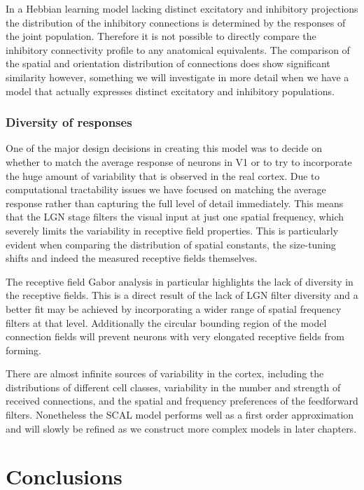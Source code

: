 In a Hebbian learning model lacking distinct excitatory and inhibitory
projections the distribution of the inhibitory connections is
determined by the responses of the joint population. Therefore it is
not possible to directly compare the inhibitory connectivity profile
to any anatomical equivalents. The comparison of the spatial and
orientation distribution of connections does show significant
similarity however, something we will investigate in more detail when
we have a model that actually expresses distinct excitatory and
inhibitory populations.

\subsubsection{Diversity of responses}

One of the major design decisions in creating this model was to decide
on whether to match the average response of neurons in V1 or to try to
incorporate the huge amount of variability that is observed in the
real cortex. Due to computational tractability issues we have focused
on matching the average response rather than capturing the full level
of detail immediately. This means that the LGN stage filters the
visual input at just one spatial frequency, which severely limits the
variability in receptive field properties. This is particularly
evident when comparing the distribution of spatial constants, the 
size-tuning shifts and indeed the measured receptive fields themselves.

The receptive field Gabor analysis in particular highlights the lack
of diversity in the receptive fields. This is a direct result of the
lack of LGN filter diversity and a better fit may be achieved by
incorporating a wider range of spatial frequency filters at that
level. Additionally the circular bounding region of the model
connection fields will prevent neurons with very elongated receptive
fields from forming.

There are almost infinite sources of variability in the cortex,
including the distributions of different cell classes, variability in
the number and strength of received connections, and the spatial and
frequency preferences of the feedforward filters. Nonetheless the SCAL
model performs well as a first order approximation and will slowly be
refined as we construct more complex models in later chapters.

\section{Conclusions}

